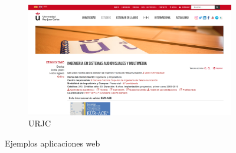 \begin{figure}[H]
\begin{subfigure}{.5\textwidth}
  \centering
  \includegraphics[width=.8\linewidth]{chapters/images/urjcweb.png}  
  \caption{URJC}
  \label{fig:sub-fourth}
\end{subfigure}
\caption{Ejemplos aplicaciones web}
\label{fig:partes robot}
\end{figure}

